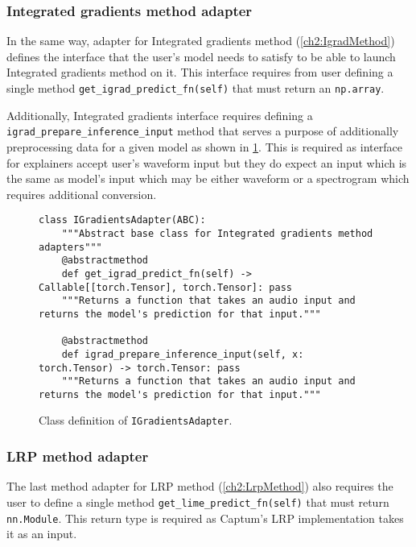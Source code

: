\documentclass[
    bindingoffset=5mm,  %
    footnoteindent=3mm, %
    hyphenation=true    %
]{src/wut-thesis}
\begin{document}
\subsubsection{Integrated gradients method adapter}

    In the same way, adapter for Integrated gradients method (\ref{ch2:IgradMethod}) defines the interface that the
    user's model needs to satisfy to be able to launch Integrated gradients method on it.
    This interface requires from user defining a single method \texttt{get_igrad_predict_fn(self)}
    that must return an \texttt{np.array}.

    Additionally, Integrated gradients interface requires defining a \texttt{igrad_prepare_inference_input}
    method that serves a purpose of additionally preprocessing data for a given model as shown in
    \ref{fig:IGradientsAdapter}. This is required as interface for explainers accept user's waveform input but they
    do expect an input which is the same as model's input which may be either waveform or a spectrogram which
    requires additional conversion.

\begin{figure}%
\begin{verbatim}
class IGradientsAdapter(ABC):
    """Abstract base class for Integrated gradients method adapters"""
    @abstractmethod
    def get_igrad_predict_fn(self) -> Callable[[torch.Tensor], torch.Tensor]: pass
    """Returns a function that takes an audio input and returns the model's prediction for that input."""

    @abstractmethod
    def igrad_prepare_inference_input(self, x: torch.Tensor) -> torch.Tensor: pass
    """Returns a function that takes an audio input and returns the model's prediction for that input."""
\end{verbatim}
\caption{Class definition of \texttt{IGradientsAdapter}.}
\label{fig:IGradientsAdapter}
\end{figure}

\subsubsection{LRP method adapter}

    The last method adapter for LRP method (\ref{ch2:LrpMethod}) also requires the user to define a single method \texttt{get_lime_predict_fn(self)} that must return \texttt{nn.Module}. This return type is required as Captum's LRP implementation takes it as an input.
\end{document}
